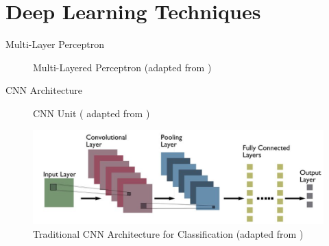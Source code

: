 \section{Deep Learning Techniques}
\begin{frame}{Multi-Layer Perceptron}
    \begin{figure}[t]
        \centering
        \resizebox{.6\linewidth}{!}{}
        \caption{Multi-Layered Perceptron (adapted from \textcite{neutelings2021_nn})}
        \label{fig:MLP}
    \end{figure}
\end{frame}

\begin{frame}{CNN Architecture}
    \begin{figure}[t]
        \centering 
        \resizebox{.6\linewidth}{!}{}
        \caption{CNN Unit ( adapted from \textcite{neutelings2022_conv})}
        \label{fig:convolution}
        \includegraphics[width=.8\linewidth]{figures/Typical-CNN-architecture.png}
        \caption{Traditional CNN Architecture for Classification (adapted from \cite{kumar2022_cnn})}
        \label{fig:CNN}
    \end{figure}
\end{frame}

